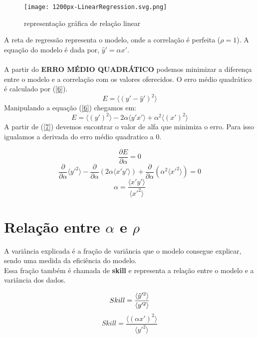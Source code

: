 \documentclass{article}
\begin{document}
\begin{figure}[h]
    \centering
    \texttt{[image: 1200px-LinearRegression.svg.png]}
    \caption{representação gráfica de relação linear}
    \label{fig:representação gráfica de relação linear}
\end{figure}

A reta de regressão representa o modelo, onde a correlação é perfeita ($\rho = 1$). A equação do modelo é dada por, $\hat{y}' = \alpha x'$. \\
\\
A partir do \textbf{ERRO MÉDIO QUADRÁTICO} podemos minimizar a diferença entre o modelo e a correlação com os valores oferecidos. O erro médio quadrático é calculado por (\ref{6}).
\begin{equation}
    E = \langle (y'-\hat{y}')^2 \rangle \label{6}
\end{equation}
Manipulando a equação (\ref{6}) chegamos em:
\begin{equation}
    E = \langle(y')^2 \rangle - 2\alpha \langle y'x' \rangle + \alpha^2 \langle (x')^2 \rangle \label{7}
\end{equation}
A partir de (\ref{7}) devemos encontrar o valor de alfa que minimiza o erro. Para isso igualamos a derivada do erro médio quadratico a 0. 

\begin{equation}
    \frac{\partial{E}}{\partial{\alpha}} = 0
\end{equation}
\begin{equation}
    \frac{\partial}{\partial{\alpha}}\langle y'^2 \rangle - \frac{\partial}{\partial{\alpha}}(2\alpha \langle x'y' \rangle) + \frac{\partial}{\partial{\alpha}}(\alpha^2 \langle x'^2 \rangle) = 0 
\end{equation}
\begin{equation}
    \alpha = \frac{\langle x'y' \rangle}{\langle x'^2 \rangle}
\end{equation}

\section{Relação entre $\alpha$ e $\rho$}
A variância explicada é a fração de variância que o modelo consegue explicar, sendo uma medida da eficiência do modelo. \\
Essa fração também é chamada de \textbf{skill} e representa a relação entre o modelo e a variância dos dados. 

\begin{equation}
    Skill = \frac{\langle \hat{y}'^2 \rangle}{\langle y'^2 \rangle}\\
\end{equation}
\begin{equation}
    Skill = \frac{\langle (\alpha x')^2 \rangle}{\langle y'^2 \rangle} \label{12}
\end{equation}
\end{document}
